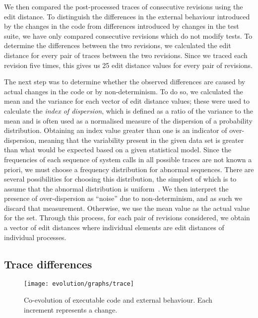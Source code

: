 We then compared the post-processed traces of consecutive revisions using the
edit distance. To distinguish the differences in the external behaviour
introduced by the changes in the code from differences introduced by changes in
the test suite, we have only compared consecutive revisions which do not modify
tests. To determine the differences between the two revisions, we calculated
the edit distance for every pair of traces between the two revisions. Since we
traced each revision five times, this gives us 25 edit distance values
for every pair of revisions.

The next step was to determine whether the observed differences are caused by
actual changes in the code or by non-determinism. To do so, we calculated the
mean and the variance for each vector of edit distance values; these were used
to calculate the \emph{index of dispersion}, which is defined as a ratio of the
variance to the mean and is often used as a normalised measure of the
dispersion of a probability distribution. Obtaining an index value greater than
one is an indicator of over-dispersion, meaning that the variability present in
the given data set is greater than what would be expected based on a given
statistical model. Since the frequencies of each sequence of system calls in
all possible traces are not known a priori, we must choose a frequency
distribution for abnormal sequences. There are several possibilities for
choosing this distribution, the simplest of which is to assume that the
abnormal distribution is uniform~\cite{helman97}. We then interpret the
presence of over-dispersion as ``noise'' due to non-determinism, and as such we
discard that measurement. Otherwise, we use the mean value as the actual value
for the set. Through this process, for each pair of revisions considered, we
obtain a vector of edit distances where individual elements are edit distances
of individual processes.

\subsection{Trace differences}

\begin{figure}[t]
  \begin{center}
    \texttt{[image: evolution/graphs/trace]}
    \caption{Co-evolution of executable code and external behaviour. Each
    increment represents a change.}
    \label{fig:coexternal}
  \end{center}
\end{figure}

